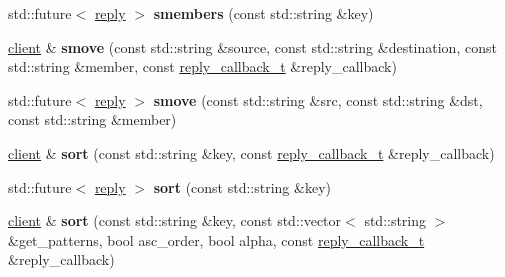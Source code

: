 \begin{DoxyCompactItemize}
\mbox{\label{classcpp__redis_1_1client_a4cdd71bfb45eb37c593d6733ba83f09a}} 
std\+::future$<$ \mbox{\hyperlink{classcpp__redis_1_1reply}{reply}} $>$ {\bfseries smembers} (const std\+::string \&key)
\item 
\mbox{\label{classcpp__redis_1_1client_a0768130822a976cfa3e27310c7a14417}} 
\mbox{\hyperlink{classcpp__redis_1_1client}{client}} \& {\bfseries smove} (const std\+::string \&source, const std\+::string \&destination, const std\+::string \&member, const \mbox{\hyperlink{classcpp__redis_1_1client_af7a65eb21aa25230bfbb0b0203c4fc04}{reply\+\_\+callback\+\_\+t}} \&reply\+\_\+callback)
\item 
\mbox{\label{classcpp__redis_1_1client_a4524b915c1180a4c57ffb16f660108ba}} 
std\+::future$<$ \mbox{\hyperlink{classcpp__redis_1_1reply}{reply}} $>$ {\bfseries smove} (const std\+::string \&src, const std\+::string \&dst, const std\+::string \&member)
\item 
\mbox{\label{classcpp__redis_1_1client_af0356b5074219ace61c71c751e1f1892}} 
\mbox{\hyperlink{classcpp__redis_1_1client}{client}} \& {\bfseries sort} (const std\+::string \&key, const \mbox{\hyperlink{classcpp__redis_1_1client_af7a65eb21aa25230bfbb0b0203c4fc04}{reply\+\_\+callback\+\_\+t}} \&reply\+\_\+callback)
\item 
\mbox{\label{classcpp__redis_1_1client_a26bd487087d47a9615092c5c6576fa0f}} 
std\+::future$<$ \mbox{\hyperlink{classcpp__redis_1_1reply}{reply}} $>$ {\bfseries sort} (const std\+::string \&key)
\item 
\mbox{\label{classcpp__redis_1_1client_a666fb5c341064c63294db7b51c51d628}} 
\mbox{\hyperlink{classcpp__redis_1_1client}{client}} \& {\bfseries sort} (const std\+::string \&key, const std\+::vector$<$ std\+::string $>$ \&get\+\_\+patterns, bool asc\+\_\+order, bool alpha, const \mbox{\hyperlink{classcpp__redis_1_1client_af7a65eb21aa25230bfbb0b0203c4fc04}{reply\+\_\+callback\+\_\+t}} \&reply\+\_\+callback)
\item 
\mbox{\label{classcpp__redis_1_1client_a8d17e0ded525626a3bc077eb3b98bc52}} 

\end{DoxyCompactItemize}

